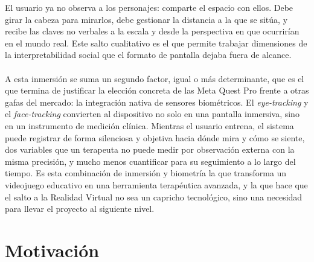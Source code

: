 \documentclass[12pt,twoside,titlepage]{report}
\begin{document}
El usuario ya no observa a los personajes: comparte el espacio con ellos.
Debe girar la cabeza para mirarlos, debe gestionar la distancia a la que se sitúa, y recibe las claves no verbales a la escala y desde la perspectiva en que ocurrirían en el mundo real.
Este salto cualitativo es el que permite trabajar dimensiones de la interpretabilidad social que el formato de pantalla dejaba fuera de alcance.\\
\\
A esta inmersión se suma un segundo factor, igual o más determinante, que es el que termina de justificar la elección concreta de las Meta Quest Pro frente a otras gafas del mercado: la integración nativa de sensores biométricos.
El \textit{eye-tracking} y el \textit{face-tracking} convierten al dispositivo no solo en una pantalla inmersiva, sino en un instrumento de medición clínica.
Mientras el usuario entrena, el sistema puede registrar de forma silenciosa y objetiva hacia dónde mira y cómo se siente, dos variables que un terapeuta no puede medir por observación externa con la misma precisión, y mucho menos cuantificar para su seguimiento a lo largo del tiempo.
Es esta combinación de inmersión y biometría la que transforma un videojuego educativo en una herramienta terapéutica avanzada, y la que hace que el salto a la Realidad Virtual no sea un capricho tecnológico, sino una necesidad para llevar el proyecto al siguiente nivel.

\section{Motivación}
\end{document}
